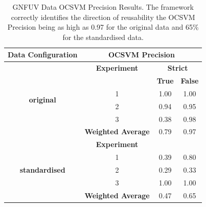 \documentclass{mpaper}
\begin{document}
\begin{table}[]
\centering
\begin{tabular}{|c|ccc|}
\hline
\textbf{Data Configuration}            & \multicolumn{3}{c|}{\textbf{OCSVM Precision}}                                         \\ \hline
\multirow{6}{*}{\textbf{original}}     & \multicolumn{1}{c|}{\textbf{Experiment}}       & \multicolumn{2}{c|}{\textbf{Strict}} \\ \cline{2-4} 
                                       & \multicolumn{1}{l|}{}                          & \textbf{True}    & \textbf{False}    \\ \cline{2-4} 
                                       & \multicolumn{1}{c|}{1}                         & 1.00             & 1.00              \\
                                       & \multicolumn{1}{c|}{2}                         & 0.94             & 0.95              \\
                                       & \multicolumn{1}{c|}{3}                         & 0.38             & 0.98              \\ \cline{2-4} 
                                       & \multicolumn{1}{c|}{\textbf{Weighted Average}} & 0.79             & 0.97              \\ \hline
\multirow{5}{*}{\textbf{standardised}} & \multicolumn{1}{c|}{\textbf{Experiment}}       &                  &                   \\ \cline{2-4} 
                                       & \multicolumn{1}{c|}{1}                         & 0.39             & 0.80              \\
                                       & \multicolumn{1}{c|}{2}                         & 0.29             & 0.33              \\
                                       & \multicolumn{1}{c|}{3}                         & 1.00             & 1.00              \\ \cline{2-4} 
                                       & \multicolumn{1}{c|}{\textbf{Weighted Average}} & 0.47             & 0.65              \\ \hline
\end{tabular}
\caption{\label{tab:gnfuv_ocsvm_precision} GNFUV Data OCSVM Precision Results. The framework correctly identifies the direction of reusability the OCSVM Precision being as high as 0.97 for the original data and 65\% for the standardised data.}
\end{table}
\end{document}
